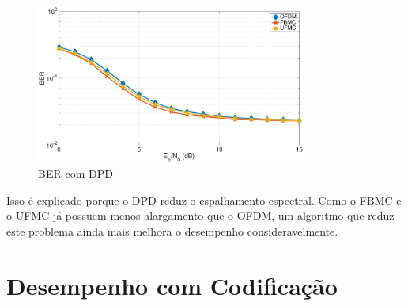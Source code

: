 \begin{figure}[h!]
\centering
\includegraphics[width=3.5in]{ber_DPD} 
\caption{BER com DPD}
\label{fig:BER_DPD}
\end{figure}

Isso é explicado porque o DPD reduz o espalhamento espectral. Como o FBMC e o UFMC já possuem menos alargamento que o OFDM, um algoritmo que reduz este problema ainda mais melhora o desempenho consideravelmente.

\section{Desempenho com Codificação}